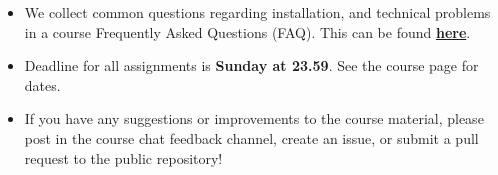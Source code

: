 \begin{itemize}

\item We collect common questions regarding installation, and technical problems in a course Frequently Asked Questions (FAQ). This can be found \href{https://github.com/MansMeg/IntroML/blob/master/FAQ.md}{\textbf{here}}.

\item Deadline for all assignments is \textbf{Sunday at 23.59}. See the course page for dates.

\item If you have any suggestions or improvements to the course material, please post in the course chat feedback channel, create an issue, or submit a pull request to the public repository!

\end{itemize}

